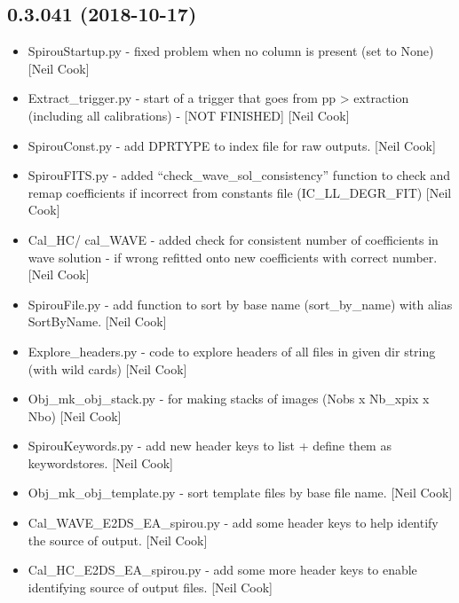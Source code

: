 \documentclass[a4paper,10pt,english]{report}
\begin{document}
\subsection{0.3.041 (2018-10-17)}
\label{\detokenize{misc/changelog:id289}}\begin{itemize}
\item {} 
SpirouStartup.py - fixed problem when no column is present (set to
None) {[}Neil Cook{]}

\item {} 
Extract\_trigger.py - start of a trigger that goes from pp \textendash{}\textgreater{}
extraction (including all calibrations) - {[}NOT FINISHED{]} {[}Neil Cook{]}

\item {} 
SpirouConst.py - add DPRTYPE to index file for raw outputs. {[}Neil
Cook{]}

\item {} 
SpirouFITS.py - added “check\_wave\_sol\_consistency” function to check
and remap coefficients if incorrect from constants file
(IC\_LL\_DEGR\_FIT) {[}Neil Cook{]}

\item {} 
Cal\_HC/ cal\_WAVE - added check for consistent number of coefficients
in wave solution - if wrong refitted onto new coefficients with
correct number. {[}Neil Cook{]}

\item {} 
SpirouFile.py - add function to sort by base name (sort\_by\_name) with
alias SortByName. {[}Neil Cook{]}

\item {} 
Explore\_headers.py - code to explore headers of all files in given dir
string (with wild cards) {[}Neil Cook{]}

\item {} 
Obj\_mk\_obj\_stack.py - for making stacks of images (Nobs x Nb\_xpix x
Nbo) {[}Neil Cook{]}

\item {} 
SpirouKeywords.py - add new header keys to list + define them as
keywordstores. {[}Neil Cook{]}

\item {} 
Obj\_mk\_obj\_template.py - sort template files by base file name. {[}Neil
Cook{]}

\item {} 
Cal\_WAVE\_E2DS\_EA\_spirou.py - add some header keys to help identify the
source of output. {[}Neil Cook{]}

\item {} 
Cal\_HC\_E2DS\_EA\_spirou.py - add some more header keys to enable
identifying source of output files. {[}Neil Cook{]}

\end{itemize}
\end{document}
